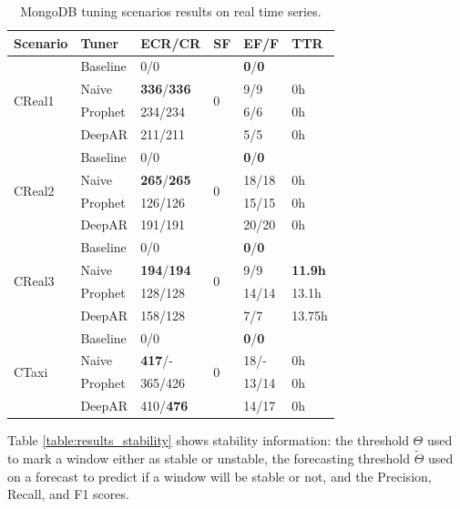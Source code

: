 \documentclass[a4paper, 12pt]{article} %
\newcommand{\ra}[1]{\renewcommand{\arraystretch}{#1}}
\begin{document}
	\begin{table}\centering 
		\ra{1.3}
		\begin{tabularx}{\textwidth}{@{}XXXXXX@{}}
			\toprule
			Scenario & Tuner & ECR/CR & SF & EF/F & TTR\\
			
			\midrule
			\multirow{4}{*}{CReal1}
			& Baseline & 0/0 & \multirow{4}{*}{0}  & \textbf{0}/\textbf{0} & \\
			& Naive & \textbf{336}/\textbf{336} && 9/9 & 0h \\
			& Prophet & 234/234 && 6/6 & 0h \\
			& DeepAR & 211/211 && 5/5 & 0h \\
			
			\midrule
			\multirow{4}{*}{CReal2}
			& Baseline & 0/0 & \multirow{4}{*}{0}  & \textbf{0}/\textbf{0} & \\
			& Naive & \textbf{265}/\textbf{265} && 18/18 & 0h \\
			& Prophet & 126/126 && 15/15 & 0h \\
			& DeepAR & 191/191 && 20/20 & 0h \\
			
			\midrule
			\multirow{4}{*}{CReal3}
			& Baseline & 0/0 & \multirow{4}{*}{0}  & \textbf{0}/\textbf{0} & \\
			& Naive & \textbf{194}/\textbf{194} && 9/9 & \textbf{11.9h} \\
			& Prophet & 128/128 && 14/14 & 13.1h \\
			& DeepAR & 158/128 && 7/7 & 13.75h \\
			
			\midrule
			\multirow{4}{*}{CTaxi}
			& Baseline & 0/0 & \multirow{4}{*}{0}  & \textbf{0}/\textbf{0} & \\
			& Naive & \textbf{417}/- && 18/- & 0h \\
			& Prophet & 365/426 && 13/14 & 0h \\
			& DeepAR & 410/\textbf{476} && 14/17 & 0h \\
			
			\bottomrule
		\end{tabularx}
		\caption{MongoDB tuning scenarios results on real time series.} \label{table:results_cassandra_real}
	\end{table}
	
	Table \ref{table:results_stability} shows stability information: the threshold $\Theta$ used to mark a window either as stable or unstable, the forecasting threshold $\tilde \Theta$ used on a forecast to predict if a window will be stable or not, and the Precision, Recall, and F1 scores. 
	
\end{document}

